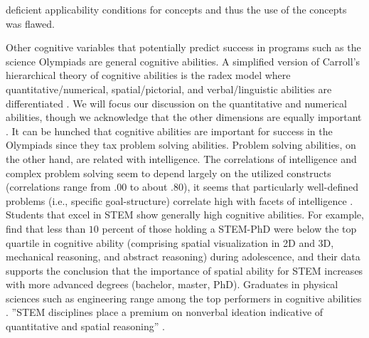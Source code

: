 \documentclass[D:/studies/WinnerS/Erhebungen/IPhO1718/paper/problem_solving/main/TaylorFrancis/interactapasample]{subfiles}
\begin{document}
deficient applicability conditions for concepts and thus the use of the concepts was flawed.


Other cognitive variables that potentially predict success in programs such as the science Olympiads are general cognitive abilities. A simplified version of Carroll's hierarchical theory of cognitive abilities is the radex model where quantitative/numerical, spatial/pictorial, and verbal/linguistic abilities are differentiated \citep{Snow.1997}. We will focus our discussion on the quantitative and numerical abilities, though we acknowledge that the other dimensions are equally important \citep{Wai.2009}. It can be hunched that cognitive abilities are important for success in the Olympiads since they tax problem solving abilities. Problem solving abilities, on the other hand, are related with intelligence. The correlations of intelligence and complex problem solving seem to depend largely on the utilized constructs (correlations range from $.00$ to about $.80$), it seems that particularly well-defined problems (i.e., specific goal-structure) correlate high with facets of intelligence \citep[summarized in:][]{Funke.2007}. Students that excel in STEM show generally high cognitive abilities. For example, \cite{Wai.2009} find that less than $10$ percent of those holding a STEM-PhD were below the top quartile in cognitive ability (comprising spatial visualization in 2D and 3D, mechanical reasoning, and abstract reasoning) during adolescence, and their data supports the conclusion that the importance of spatial ability for STEM increases with more advanced degrees (bachelor, master, PhD). Graduates in physical sciences such as engineering range among the top performers in cognitive abilities \citep[see also:][]{Shea.2001}. ''STEM disciplines place a premium on nonverbal ideation indicative of quantitative and spatial reasoning'' \citep{Lubinski.2010}. 
\end{document}
